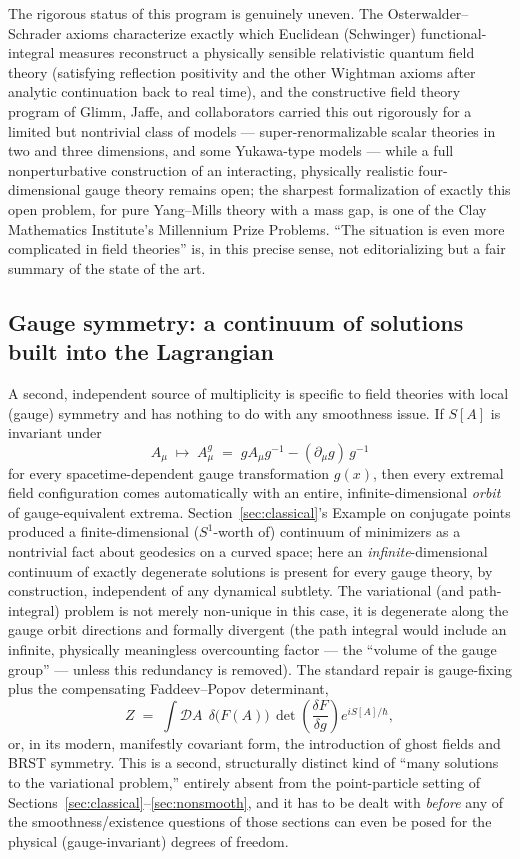 \documentclass[11pt]{article}
\newcommand{\D}{\mathcal{D}}
\begin{document}
The rigorous status of this program is genuinely uneven. The Osterwalder--Schrader axioms characterize exactly which Euclidean (Schwinger) functional-integral measures reconstruct a physically sensible relativistic quantum field theory (satisfying reflection positivity and the other Wightman axioms after analytic continuation back to real time), and the constructive field theory program of Glimm, Jaffe, and collaborators carried this out rigorously for a limited but nontrivial class of models --- super-renormalizable scalar theories in two and three dimensions, and some Yukawa-type models --- while a full nonperturbative construction of an interacting, physically realistic four-dimensional gauge theory remains open; the sharpest formalization of exactly this open problem, for pure Yang--Mills theory with a mass gap, is one of the Clay Mathematics Institute's Millennium Prize Problems. ``The situation is even more complicated in field theories'' is, in this precise sense, not editorializing but a fair summary of the state of the art.

\subsection{Gauge symmetry: a continuum of solutions built into the Lagrangian}

A second, independent source of multiplicity is specific to field theories with local (gauge) symmetry and has nothing to do with any smoothness issue. If $S[A]$ is invariant under
\[
A_\mu \;\longmapsto\; A_\mu^{g} \;=\; g A_\mu g^{-1} - (\partial_\mu g)\, g^{-1}
\]
for every spacetime-dependent gauge transformation $g(x)$, then every extremal field configuration comes automatically with an entire, infinite-dimensional \emph{orbit} of gauge-equivalent extrema. Section~\ref{sec:classical}'s Example on conjugate points produced a finite-dimensional ($S^1$-worth of) continuum of minimizers as a nontrivial fact about geodesics on a curved space; here an \emph{infinite}-dimensional continuum of exactly degenerate solutions is present for every gauge theory, by construction, independent of any dynamical subtlety. The variational (and path-integral) problem is not merely non-unique in this case, it is degenerate along the gauge orbit directions and formally divergent (the path integral would include an infinite, physically meaningless overcounting factor --- the ``volume of the gauge group'' --- unless this redundancy is removed). The standard repair is gauge-fixing plus the compensating Faddeev--Popov determinant,
\[
Z \;=\; \int \D A\;\, \delta\bigl(F(A)\bigr)\, \det\!\left(\frac{\delta F}{\delta g}\right) e^{iS[A]/\hbar},
\]
or, in its modern, manifestly covariant form, the introduction of ghost fields and BRST symmetry. This is a second, structurally distinct kind of ``many solutions to the variational problem,'' entirely absent from the point-particle setting of Sections~\ref{sec:classical}--\ref{sec:nonsmooth}, and it has to be dealt with \emph{before} any of the smoothness/existence questions of those sections can even be posed for the physical (gauge-invariant) degrees of freedom.
\end{document}
